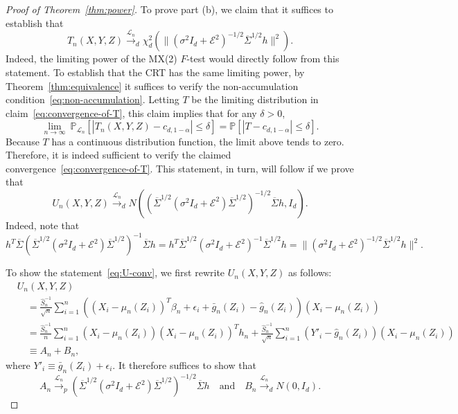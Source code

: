 \documentclass[12pt]{article}
\theoremstyle{definition}
\theoremstyle{remark}
\newcommand{\eps}{\epsilon}
\newcommand{\srx}{X}
\newcommand{\srz}{Z}
\newcommand{\sry}{Y}
\newcommand{\seps}{\epsilon}
\begin{document}
\begin{proof}[Proof of Theorem~\ref{thm:power}]
To prove part (b), we claim that it suffices to establish that
\begin{equation}
	T_n(\srx, \sry, \srz)\overset{\mathcal L_n}\rightarrow_d \chi^2_d(\|(\sigma^2I_d +\mathcal E^2)^{-1/2}\overline \Sigma^{1/2} h\|^2).
	\label{eq:convergence-of-T}
\end{equation}
Indeed, the limiting power of the MX(2) $F$-test would directly follow from this statement. To establish that the CRT has the same limiting power, by Theorem~\ref{thm:equivalence} it suffices to verify the non-accumulation condition~\eqref{eq:non-accumulation}. Letting $T$ be the limiting distribution in claim~\eqref{eq:convergence-of-T}, this claim implies that for any $\delta > 0$,
\begin{equation*}
 \lim_{n \rightarrow \infty}\ \mathbb P_{\mathcal L_n}[|T_n(\srx, \sry, \srz)-c_{d,1-\alpha}| \leq \delta] = \mathbb P[|T - c_{d,1-\alpha}| \leq \delta].
\end{equation*}
Because $T$ has a continuous distribution function, the limit above tends to zero. Therefore, it is indeed sufficient to verify the claimed convergence~\eqref{eq:convergence-of-T}. This statement, in turn, will follow if we prove that
	\begin{equation}
		U_n(\srx, \sry, \srz) \overset{\mathcal L_n}\rightarrow_d N((\overline \Sigma^{1/2}(\sigma^2I_d +\mathcal E^2)\overline \Sigma^{1/2})^{-1/2}\overline \Sigma h, I_d).
		\label{eq:U-conv}
	\end{equation}
	Indeed, note that
	\begin{equation*}
		h^T \overline \Sigma (\overline \Sigma^{1/2}(\sigma^2I_d +\mathcal E^2)\overline \Sigma^{1/2})^{-1}\overline \Sigma h = h^T \overline \Sigma^{1/2} (\sigma^2I_d +\mathcal E^2)^{-1}\overline \Sigma^{1/2} h = \|(\sigma^2I_d +\mathcal E^2)^{-1/2}\overline \Sigma^{1/2} h\|^2.
	\end{equation*}
	
	To show the statement~\eqref{eq:U-conv}, we first rewrite $U_n(\srx, \sry,\srz)$ as follows:
	\begin{equation*}
		\begin{split}
			&U_n(X,Y,Z) \\
			&\quad= \frac{\widehat S^{-1}_n}{\sqrt{n}}\sum_{i = 1}^n ((X_i - \mu_n(Z_i))^T \beta_n + \eps_i + \bar g_n(\srz_i) - \widehat g_n(\srz_i))(\srx_i - \mu_n(\srz_i)) \\
			&\quad= \frac{\widehat S^{-1}_n}{n}\sum_{i = 1}^n (\srx_i - \mu_n(\srz_i))(X_i - \mu_n(Z_i))^T h_n + \frac{\widehat S^{-1}_n}{\sqrt{n}}\sum_{i = 1}^n (Y'_i - \widehat g_n(Z_i))(\srx_i - \mu_n(\srz_i)) \\
			&\quad \equiv A_n + B_n,
		\end{split}
	\end{equation*}
	where $Y'_i \equiv \bar g_n(\srz_i) + \seps_i.$ It therefore suffices to show that
	\begin{equation}
		A_n \overset{\mathcal L_n}\rightarrow_p (\overline \Sigma^{1/2}(\sigma^2 I_d + \mathcal E^2)\overline \Sigma^{1/2})^{-1/2}\overline \Sigma h\quad \text{and} \quad B_n \overset{\mathcal L_n}\rightarrow_d N(0, I_d).
		\label{eq:sufficient}
	\end{equation}
	

\end{proof}
\end{document}
